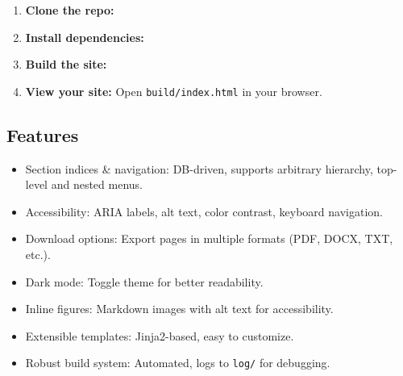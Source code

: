 \begin{enumerate}
\def\labelenumi{\arabic{enumi}.}
\item
  \textbf{Clone the repo:}

\begin{Shaded}
\begin{Highlighting}[]
\end{Highlighting}
\end{Shaded}
\item
  \textbf{Install dependencies:}

\begin{Shaded}
\begin{Highlighting}[]
\end{Highlighting}
\end{Shaded}
\item
  \textbf{Build the site:}

\begin{Shaded}
\begin{Highlighting}[]
\end{Highlighting}
\end{Shaded}
\item
  \textbf{View your site:} Open \texttt{build/index.html} in your
  browser.
\end{enumerate}

\subsection{Features}\label{features}

\begin{itemize}
\tightlist
\item
  Section indices \& navigation: DB-driven, supports arbitrary
  hierarchy, top-level and nested menus.
\item
  Accessibility: ARIA labels, alt text, color contrast, keyboard
  navigation.
\item
  Download options: Export pages in multiple formats (PDF, DOCX, TXT,
  etc.).
\item
  Dark mode: Toggle theme for better readability.
\item
  Inline figures: Markdown images with alt text for accessibility.
\item
  Extensible templates: Jinja2-based, easy to customize.
\item
  Robust build system: Automated, logs to \texttt{log/} for debugging.
\end{itemize}

